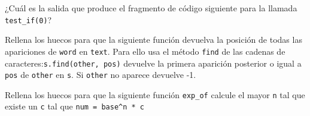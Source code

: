 \documentclass[10pt]{examdesign}
\begin{document}
\begin{multiplechoice}[
title={Preguntas de opción múltiple (5 puntos)},
suppressprefix]
  \begin{question}
    ¿Cuál es la salida que produce el fragmento de código siguiente
    para la llamada \lstinline{test_if(0)}?
  \end{question}


\end{multiplechoice}



\begin{fillin}
[title={Rellena el código que falta (1 punto)},
suppressprefix]



  \begin{question}[0.5 pt]
  Rellena los huecos para que la siguiente función devuelva la posición de todas las apariciones de \lstinline{word} en
\lstinline{text}. Para ello usa el método \lstinline{find} de las cadenas de caracteres:\lstinline{s.find(other, pos)} devuelve la primera aparición posterior o igual a \lstinline{pos} de \lstinline{other} en \lstinline{s}. Si \lstinline{other} no aparece devuelve -1.

  \end{question}



  \begin{question}[0.5 pt]
  Rellena los huecos para que la siguiente función \lstinline{exp_of} calcule el mayor \lstinline{n}
tal que existe un \lstinline{c} tal que \lstinline{num = base^n * c}
  \end{question}


\end{fillin}
\end{document}
